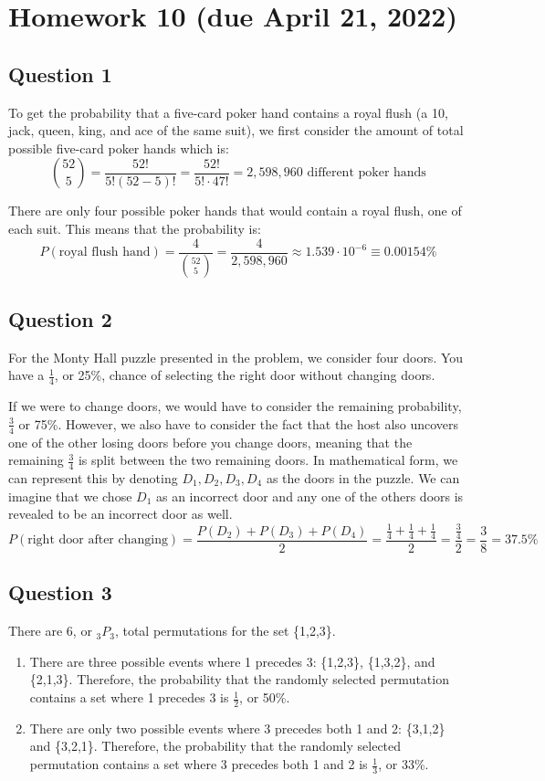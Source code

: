\documentclass[letterpaper, 12pt]{article}
\begin{document}
\section*{Homework 10 (due April 21, 2022)}

\subsection*{Question 1}
To get the probability that a five-card poker hand contains a royal flush (a 10, jack, queen, king, and ace of the same suit), we first consider the amount of total possible five-card poker hands which is:
\[\binom{52}{5} = \frac{52!}{5!(52-5)!} = \frac{52!}{5! \cdot 47!} = 2,598,960 \text{ different poker hands}\]

There are only four possible poker hands that would contain a royal flush, one of each suit. This means that the probability is:
\[P(\text{royal flush hand}) = \frac{4}{\binom{52}{5}} = \frac{4}{2,598,960} \approx 1.539 \cdot 10^{-6} \equiv 0.00154\%\]

\subsection*{Question 2}
For the Monty Hall puzzle presented in the problem, we consider four doors. You have a $\frac{1}{4}$, or 25\%, chance of selecting the right door without changing doors. 

If we were to change doors, we would have to consider the remaining probability, $\frac{3}{4}$ or 75\%. However, we also have to consider the fact that the host also uncovers one of the other losing doors before you change doors, meaning that the remaining $\frac{3}{4}$ is split between the two remaining doors. In mathematical form, we can represent this by denoting $D_1, D_2, D_3, D_4$ as the doors in the puzzle. We can imagine that we chose $D_1$ as an incorrect door and any one of the others doors is revealed to be an incorrect door as well.
\[P(\text{right door after changing}) = \frac{P(D_2) + P(D_3) + P(D_4)}{2} = \frac{\frac{1}{4} + \frac{1}{4} + \frac{1}{4}}{2} = \frac{\frac{3}{4}}{2} = \frac{3}{8} = 37.5\%\]

\subsection*{Question 3}
There are 6, or $_{3}P_{3}$, total permutations for the set \{1,2,3\}.

\begin{enumerate}
    \item There are three possible events where 1 precedes 3: \{1,2,3\}, \{1,3,2\}, and \{2,1,3\}. Therefore, the probability that the randomly selected permutation contains a set where 1 precedes 3 is $\frac{1}{2}$, or 50\%.
    \item There are only two possible events where 3 precedes both 1 and 2: \{3,1,2\} and \{3,2,1\}. Therefore, the probability that the randomly selected permutation contains a set where 3 precedes both 1 and 2 is $\frac{1}{3}$, or 33\%.
\end{enumerate}
\end{document}
